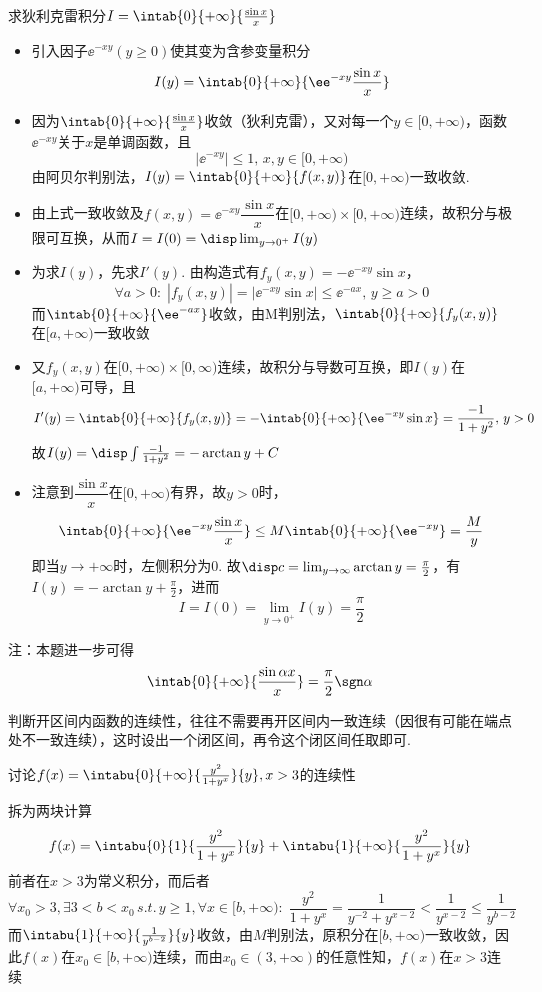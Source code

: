 \begin{example}
求狄利克雷积分$I=\intab{0}{+\infty}{\frac{\sin x}{x}}$
\end{example}
\begin{analysis}
\begin{itemize}
\item 引入因子$\ee^{-xy}(y\geq 0)$使其变为含参变量积分
\[I(y)=\intab{0}{+\infty}{\ee^{-xy}\frac{\sin x}{x}}\]
\item 因为$\intab{0}{+\infty}{\frac{\sin x}{x}}$收敛（狄利克雷），又对每一个$y\in[0,+\infty)$，函数$\ee^{-xy}$关于$x$是单调函数，且
\[|\ee^{-xy}|\leq 1,\,x,y\in[0,+\infty)\]
由阿贝尔判别法，$I(y)=\intab{0}{+\infty}{f(x,y)}$在$[0,+\infty)$一致收敛.
\item 由上式一致收敛及$f(x,y)=\ee^{-xy}\dfrac{\sin x}{x}$在$[0,+\infty)\times[0,+\infty)$连续，故积分与极限可互换，从而$I=I(0)=\disp\lim_{y\to 0^+}I(y)$
\item 为求$I(y)$，先求$I'(y)$.
由构造式有$f_y(x,y)=-\ee^{-xy}\sin x$，
\[\forall a>0:\;|f_y(x,y)|=|\ee^{-xy}\sin x|\leq \ee^{-ax},\,y\geq a>0\]
而$\intab{0}{+\infty}{\ee^{-ax}}$收敛，由M判别法，$\intab{0}{+\infty}{f_y(x,y)}$在$[a,+\infty)$一致收敛
\item 又$f_y(x,y)$在$[0,+\infty)\times[0,\infty)$连续，故积分与导数可互换，即$I(y)$在$[a,+\infty)$可导，且
\[I'(y)=\intab{0}{+\infty}{f_y(x,y)}=-\intab{0}{+\infty}{\ee^{-xy}\sin x}=\frac{-1}{1+y^2},\,y>0\]
故$I(y)=\disp\int\frac{-1}{1+y^2}=-\arctan y+C$
\item 注意到$\dfrac{\sin x}{x}$在$[0,+\infty)$有界，故$y>0$时，
\[\intab{0}{+\infty}{\ee^{-xy}\frac{\sin x}{x}}\leq M\intab{0}{+\infty}{\ee^{-xy}}=\frac{M}{y}\]
即当$y\to +\infty$时，左侧积分为$0$.
故$\disp c=\lim_{y\to\infty}\arctan y=\frac{\pi}{2}$，有$I(y)=-\arctan y+\frac{\pi}{2}$，进而
\[I=I(0)=\lim_{y\to 0^+}I(y)=\frac{\pi}{2}\]
\end{itemize}
注：本题进一步可得
\[\intab{0}{+\infty}{\frac{\sin\alpha x}{x}}=\frac{\pi}{2}\sgn\alpha\]
\end{analysis}
\par 判断开区间内函数的连续性，往往不需要再开区间内一致连续（因很有可能在端点处不一致连续），这时设出一个闭区间，再令这个闭区间任取即可.
\begin{example}
讨论$f(x)=\intabu{0}{+\infty}{\frac{y^2}{1+y^x}}{y},x>3$的连续性
\end{example}
\begin{analysis}
拆为两块计算
\[f(x)=\intabu{0}{1}{\frac{y^2}{1+y^x}}{y}+\intabu{1}{+\infty}{\frac{y^2}{1+y^x}}{y}\]
前者在$x>3$为常义积分，而后者
\[\forall x_0>3,\exists 3<b<x_0\,s.t.\,y\geq 1,\forall x\in[b,+\infty):\;\frac{y^2}{1+y^x}=\frac{1}{y^{-2}+y^{x-2}}<\frac{1}{y^{x-2}}\leq\frac{1}{y^{b-2}}\]
而$\intabu{1}{+\infty}{\frac{1}{y^{b-2}}}{y}$收敛，由$M$判别法，原积分在$[b,+\infty)$一致收敛，因此$f(x)$在$x_0\in[b,+\infty)$连续，而由$x_0\in(3,+\infty)$的任意性知，$f(x)$在$x>3$连续
\end{analysis}
